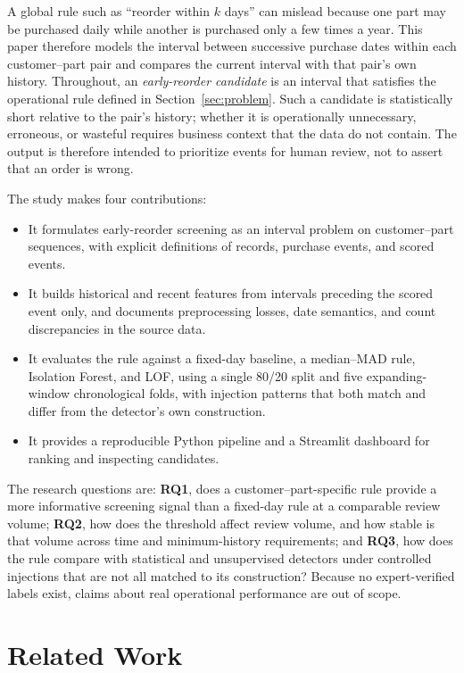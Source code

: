 \documentclass[conference]{IEEEtran}
\begin{document}
A global rule such as ``reorder within $k$ days'' can mislead because one part may be purchased daily while another is purchased only a few times a year. This paper therefore models the interval between successive purchase dates within each customer--part pair and compares the current interval with that pair's own history. Throughout, an \emph{early-reorder candidate} is an interval that satisfies the operational rule defined in Section~\ref{sec:problem}. Such a candidate is statistically short relative to the pair's history; whether it is operationally unnecessary, erroneous, or wasteful requires business context that the data do not contain. The output is therefore intended to prioritize events for human review, not to assert that an order is wrong.

The study makes four contributions:
\begin{itemize}
    \item It formulates early-reorder screening as an interval problem on customer--part sequences, with explicit definitions of records, purchase events, and scored events.
    \item It builds historical and recent features from intervals preceding the scored event only, and documents preprocessing losses, date semantics, and count discrepancies in the source data.
    \item It evaluates the rule against a fixed-day baseline, a median--MAD rule, Isolation Forest, and LOF, using a single 80/20 split and five expanding-window chronological folds, with injection patterns that both match and differ from the detector's own construction.
    \item It provides a reproducible Python pipeline and a Streamlit dashboard for ranking and inspecting candidates.
\end{itemize}

The research questions are: \textbf{RQ1}, does a customer--part-specific rule provide a more informative screening signal than a fixed-day rule at a comparable review volume; \textbf{RQ2}, how does the threshold affect review volume, and how stable is that volume across time and minimum-history requirements; and \textbf{RQ3}, how does the rule compare with statistical and unsupervised detectors under controlled injections that are not all matched to its construction? Because no expert-verified labels exist, claims about real operational performance are out of scope.

\section{Related Work}
\end{document}
